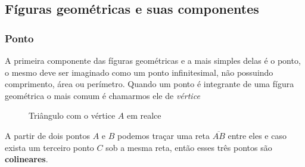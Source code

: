 \begin{multicols*}{2}


    \subsection*{Fíguras geométricas e suas componentes}

    \subsubsection*{Ponto}
    A primeira componente das fíguras geométricas e a mais simples delas é o ponto, o mesmo deve ser imaginado como um
    ponto infinitesimal, não possuindo comprimento, área ou perímetro. Quando um ponto é integrante de uma fígura
    geométrica o mais comum é chamarmos ele de \textit{vértice}
    \begin{figure}[H]
        \centering
        \caption{Triângulo com o vértice $A$ em realce }
    \end{figure}



    A partir de dois pontos $A$ e $B$ podemos traçar uma reta $\overline{AB}$ entre eles e caso exista um terceiro ponto $C$ sob a mesma reta, 
    então esses três pontos são \textbf{colineares}.    


\end{multicols*}

